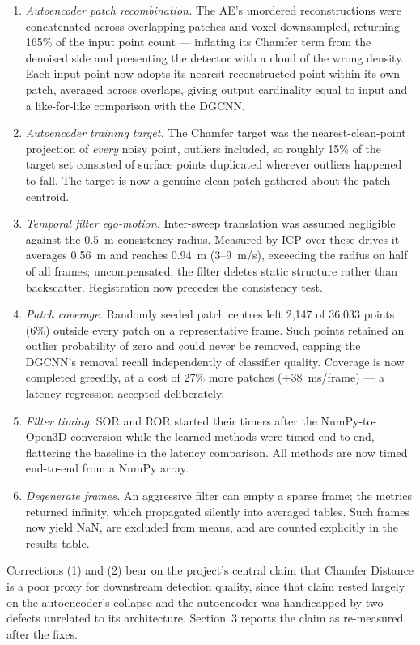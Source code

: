 \documentclass[12pt,a4paper]{article}
\begin{document}
\begin{enumerate}\setlength{\itemsep}{2pt}
\item \emph{Autoencoder patch recombination.} The AE's unordered
reconstructions were concatenated across overlapping patches and
voxel-downsampled, returning 165\% of the input point count --- inflating
its Chamfer term from the denoised side and presenting the detector with a
cloud of the wrong density. Each input point now adopts its nearest
reconstructed point within its own patch, averaged across overlaps, giving
output cardinality equal to input and a like-for-like comparison with the
DGCNN.
\item \emph{Autoencoder training target.} The Chamfer target was the
nearest-clean-point projection of \emph{every} noisy point, outliers
included, so roughly 15\% of the target set consisted of surface points
duplicated wherever outliers happened to fall. The target is now a genuine
clean patch gathered about the patch centroid.
\item \emph{Temporal filter ego-motion.} Inter-sweep translation was assumed
negligible against the 0.5~m consistency radius. Measured by ICP over these
drives it averages 0.56~m and reaches 0.94~m (3--9~m/s), exceeding the
radius on half of all frames; uncompensated, the filter deletes static
structure rather than backscatter. Registration now precedes the
consistency test.
\item \emph{Patch coverage.} Randomly seeded patch centres left 2{,}147 of
36{,}033 points (6\%) outside every patch on a representative frame. Such
points retained an outlier probability of zero and could never be removed,
capping the DGCNN's removal recall independently of classifier quality.
Coverage is now completed greedily, at a cost of 27\% more patches
(+38~ms/frame) --- a latency regression accepted deliberately.
\item \emph{Filter timing.} SOR and ROR started their timers after the
NumPy-to-Open3D conversion while the learned methods were timed end-to-end,
flattering the baseline in the latency comparison. All methods are now
timed end-to-end from a NumPy array.
\item \emph{Degenerate frames.} An aggressive filter can empty a sparse
frame; the metrics returned infinity, which propagated silently into
averaged tables. Such frames now yield NaN, are excluded from means, and
are counted explicitly in the results table.
\end{enumerate}

Corrections (1) and (2) bear on the project's central claim that Chamfer
Distance is a poor proxy for downstream detection quality, since that claim
rested largely on the autoencoder's collapse and the autoencoder was
handicapped by two defects unrelated to its architecture. Section~3 reports
the claim as re-measured after the fixes.
\end{document}
